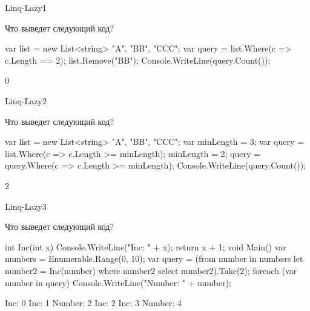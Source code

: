\begin{defproblem}{Linq-Lazy1}
\begin{onlyproblem}
  Что выведет следующий код?
  \begin{source}
  var list = new List<string> {"A", "BB", "CCC"};
  var query = list.Where(c => c.Length == 2);
  list.Remove("BB");
  Console.WriteLine(query.Count());
  \end{source}
\end{onlyproblem}
\begin{onlysolution}
  \begin{source}
  0
  \end{source}
\end{onlysolution}
\end{defproblem}
\begin{defproblem}{Linq-Lazy2}
\begin{onlyproblem}
  Что выведет следующий код?
  \begin{source}
  var list = new List<string> {"A", "BB", "CCC"};
  var minLength = 3;
  var query = list.Where(c => c.Length >= minLength);
  minLength = 2;
  query = query.Where(c => c.Length >= minLength);
  Console.WriteLine(query.Count());
  \end{source}
\end{onlyproblem}
\begin{onlysolution}
  \begin{source}
  2
  \end{source}
\end{onlysolution}
\end{defproblem}
\begin{defproblem}{Linq-Lazy3}
\begin{onlyproblem}
  Что выведет следующий код?
  \begin{source}
  int Inc(int x)
  {
    Console.WriteLine("Inc: " + x);
    return x + 1;
  }
  void Main()
  {
    var numbers = Enumerable.Range(0, 10);
    var query = 
      (from number in numbers
       let number2 = Inc(number)
       where number2 %
       select number2).Take(2);
    foreach (var number in query)
      Console.WriteLine("Number: " + number);
  }
  \end{source}
\end{onlyproblem}
\begin{onlysolution}
  \begin{source}
  Inc: 0
  Inc: 1
  Number: 2
  Inc: 2
  Inc: 3
  Number: 4
  \end{source}
\end{onlysolution}
\end{defproblem}
